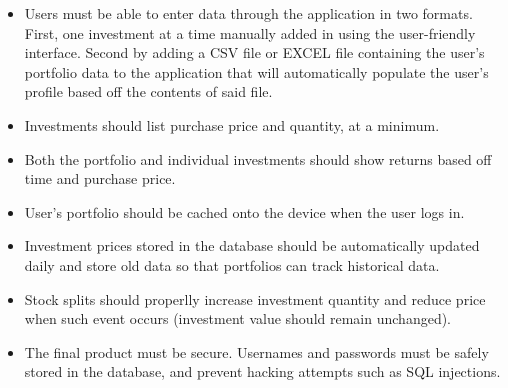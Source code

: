 \documentclass[onecolumn, draftclsnofoot,10pt, compsoc]{IEEEtran}
\begin{document}
\begin{itemize}
	\item Users must be able to enter data through the application in two formats. First, one investment at a time manually added in using the user-friendly interface. Second by
		adding a CSV file or EXCEL file containing the user's portfolio data to the application that will automatically populate the user's profile based off the contents of said file.
	\item Investments should list purchase price and quantity, at a minimum.
	\item Both the portfolio and individual investments should show returns based off time and purchase price.
	\item User's portfolio should be cached onto the device when the user logs in.
	\item Investment prices stored in the database should be automatically updated daily and store old data so that portfolios can track historical data.
	\item Stock splits should properlly increase investment quantity and reduce price when such event occurs (investment value should remain unchanged).
	\item The final product must be secure. Usernames and passwords must be safely stored in the database, and prevent hacking attempts such as SQL injections.
	
\end{itemize}
\end{document}
